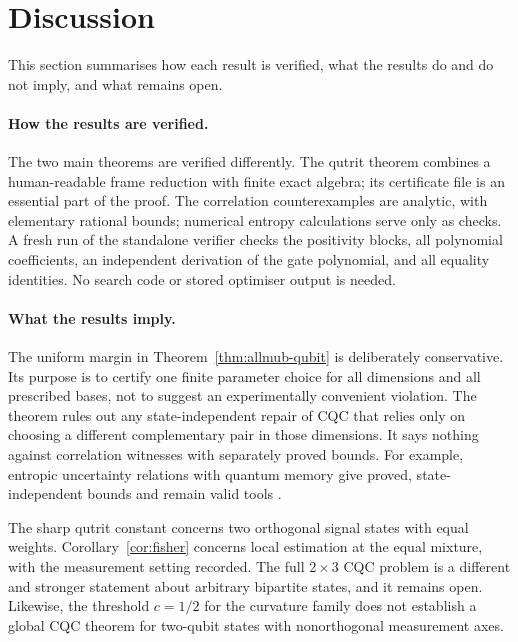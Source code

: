 \documentclass[11pt,a4paper]{article}
\numberwithin{equation}{section}
\theoremstyle{remark}\newtheorem{remark}[theorem]{Remark}
\begin{document}
\section{Discussion}\label{sec:discussion}
This section summarises how each result is verified, what the results do and do not imply, and what remains open.

\paragraph{How the results are verified.}
The two main theorems are verified differently. The qutrit theorem combines a human-readable frame reduction with finite exact algebra; its certificate file is an essential part of the proof. The correlation counterexamples are analytic, with elementary rational bounds; numerical entropy calculations serve only as checks. A fresh run of the standalone verifier checks the positivity blocks, all polynomial coefficients, an independent derivation of the gate polynomial, and all equality identities. No search code or stored optimiser output is needed.

\paragraph{What the results imply.}
The uniform margin in Theorem~\ref{thm:allmub-qubit} is deliberately conservative. Its purpose is to certify one finite parameter choice for all dimensions and all prescribed bases, not to suggest an experimentally convenient violation. The theorem rules out any state-independent repair of CQC that relies only on choosing a different complementary pair in those dimensions. It says nothing against correlation witnesses with separately proved bounds. For example, entropic uncertainty relations with quantum memory give proved, state-independent bounds and remain valid tools \cite{berta,coles}.

The sharp qutrit constant concerns two orthogonal signal states with equal weights. Corollary~\ref{cor:fisher} concerns local estimation at the equal mixture, with the measurement setting recorded. The full $2\times3$ CQC problem is a different and stronger statement about arbitrary bipartite states, and it remains open. Likewise, the threshold $c=1/2$ for the curvature family does not establish a global CQC theorem for two-qubit states with nonorthogonal measurement axes.
\end{document}
